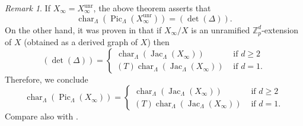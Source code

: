 \documentclass{amsart}
\numberwithin{equation}{section}
\theoremstyle{remark}
\newtheorem{remark}[theorem]{Remark}
\newcommand{\Jac}{\operatorname{Jac}}
\newcommand{\Pic}{\operatorname{Pic}}
\newcommand{\Char}{\operatorname{char}}
\newcommand{\unr}{\operatorname{unr}}
\newcommand{\Z}{\mathbb{Z}}
\theoremstyle{plain} %
\begin{document}
\begin{remark}
If $X_\infty = X_\infty^{\unr}$, the above theorem asserts that
\[
\Char_{\Lambda}(\Pic_{\Lambda}(X_\infty^{\unr})) = (\det(\Delta)).
\]
On the other hand, it was proven in \cite[Theorem~5.2]{Kleine-Mueller4} that if $X_\infty/X$ is an unramified $\Z_p^d$-extension of $X$ (obtained as a derived graph of $X$) then
\[
(\det(\Delta)) = \begin{cases}
    \Char_{\Lambda}(\Jac_{\Lambda}(X_\infty)) & \textrm{ if } d\ge 2\\
    (T)\Char_{\Lambda}(\Jac_{\Lambda}(X_\infty)) & \textrm{ if } d=1.
\end{cases}
\]
Therefore, we conclude
\[
\Char_{\Lambda}(\Pic_{\Lambda}(X_\infty)) = \begin{cases}
    \Char_{\Lambda}(\Jac_{\Lambda}(X_\infty)) & \textrm{ if } d\ge 2\\
    (T)\Char_{\Lambda}(\Jac_{\Lambda}(X_\infty)) & \textrm{ if } d=1.
\end{cases}
\]
Compare also with \cite[Remark~5.4]{Kleine-Mueller4}.
\end{remark}
\end{document}
